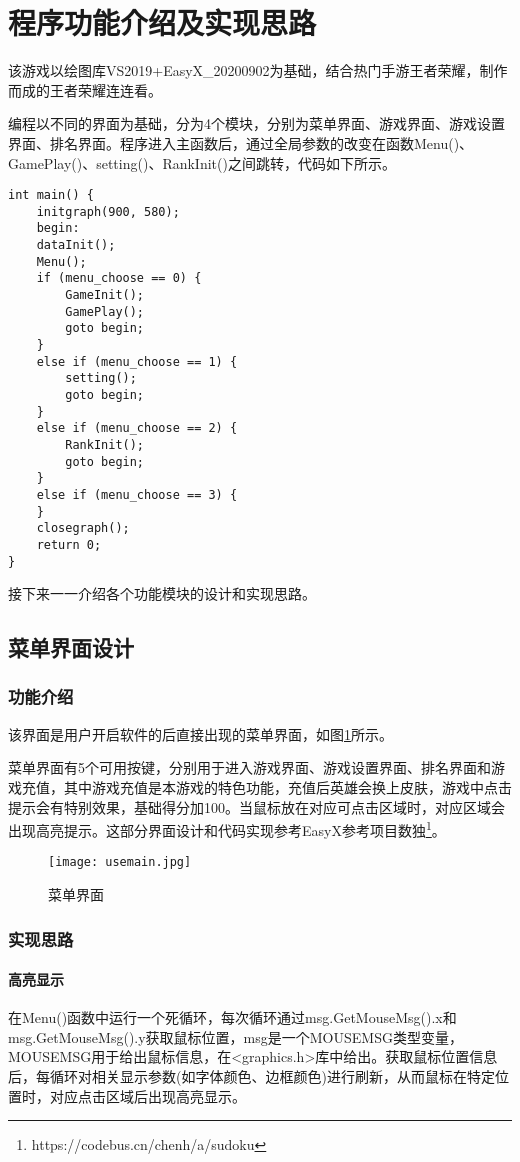 \section{程序功能介绍及实现思路}
该游戏以绘图库VS2019+EasyX\_20200902为基础，结合热门手游王者荣耀，制作而成的王者荣耀连连看。

编程以不同的界面为基础，分为4个模块，分别为菜单界面、游戏界面、游戏设置界面、排名界面。程序进入主函数后，通过全局参数的改变在函数Menu()、GamePlay()、setting()、RankInit()之间跳转，代码如下所示。

\lstset{language=C}
\begin{lstlisting}
int main() {
    initgraph(900, 580);
    begin:
    dataInit();
    Menu();
    if (menu_choose == 0) {
        GameInit();
        GamePlay();
        goto begin;
    }
    else if (menu_choose == 1) {
        setting();
        goto begin;
    }
    else if (menu_choose == 2) {
        RankInit();
        goto begin;
    }
    else if (menu_choose == 3) {
    }
    closegraph();
    return 0;
}
\end{lstlisting}

接下来一一介绍各个功能模块的设计和实现思路。

\subsection{菜单界面设计}
\subsubsection{功能介绍}
该界面是用户开启软件的后直接出现的菜单界面，如图\ref{fig:usemain}所示。

菜单界面有5个可用按键，分别用于进入游戏界面、游戏设置界面、排名界面和游戏充值，其中游戏充值是本游戏的特色功能，充值后英雄会换上皮肤，游戏中点击提示会有特别效果，基础得分加100。当鼠标放在对应可点击区域时，对应区域会出现高亮提示。这部分界面设计和代码实现参考EasyX参考项目数独\footnote{https://codebus.cn/chenh/a/sudoku}。

\begin{figure}[!htbp]
    \centering
    \texttt{[image: usemain.jpg]}
    \caption{菜单界面} \label{fig:usemain}
\end{figure}

\subsubsection{实现思路}
\paragraph{高亮显示}
在Menu()函数中运行一个死循环，每次循环通过msg.GetMouseMsg().x和msg.GetMouseMsg().y获取鼠标位置，msg是一个MOUSEMSG类型变量，MOUSEMSG用于给出鼠标信息，在<graphics.h>库中给出。获取鼠标位置信息后，每循环对相关显示参数(如字体颜色、边框颜色)进行刷新，从而鼠标在特定位置时，对应点击区域后出现高亮显示。
